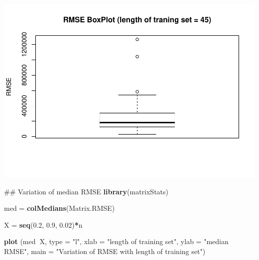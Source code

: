 \documentclass[a4paper, 12pt]{article}
\newenvironment{Shaded}{\begin{snugshade}}{\end{snugshade}}
\newcommand{\KeywordTok}[1]{\textcolor[rgb]{0.13,0.29,0.53}{\textbf{#1}}}
\newcommand{\DataTypeTok}[1]{\textcolor[rgb]{0.13,0.29,0.53}{#1}}
\newcommand{\DecValTok}[1]{\textcolor[rgb]{0.00,0.00,0.81}{#1}}
\newcommand{\FloatTok}[1]{\textcolor[rgb]{0.00,0.00,0.81}{#1}}
\newcommand{\StringTok}[1]{\textcolor[rgb]{0.31,0.60,0.02}{#1}}
\newcommand{\OperatorTok}[1]{\textcolor[rgb]{0.81,0.36,0.00}{\textbf{#1}}}
\newcommand{\NormalTok}[1]{#1}
\begin{document}
\begin{Shaded}
\end{Shaded}

\includegraphics{Artigo_files/figure-latex/unnamed-chunk-5-1.pdf}

\begin{Shaded}
\begin{Highlighting}[]
\NormalTok{## Variation of median RMSE }
\KeywordTok{library}\NormalTok{(matrixStats)}

\NormalTok{med =}\StringTok{ }\KeywordTok{colMedians}\NormalTok{(Matrix.RMSE)}

\NormalTok{X =}\StringTok{ }\KeywordTok{seq}\NormalTok{(}\FloatTok{0.2}\NormalTok{, }\FloatTok{0.9}\NormalTok{, }\FloatTok{0.02}\NormalTok{)}\OperatorTok{*}\NormalTok{n}

\KeywordTok{plot}\NormalTok{ (med}\OperatorTok{~}\NormalTok{X, }\DataTypeTok{type =} \StringTok{"l"}\NormalTok{, }
      \DataTypeTok{xlab =} \StringTok{"length of training set"}\NormalTok{, }
      \DataTypeTok{ylab =} \StringTok{"median RMSE"}\NormalTok{, }
      \DataTypeTok{main =} \StringTok{"Variation of RMSE with length of training set"}\NormalTok{)}
\end{Highlighting}
\end{Shaded}
\end{document}
